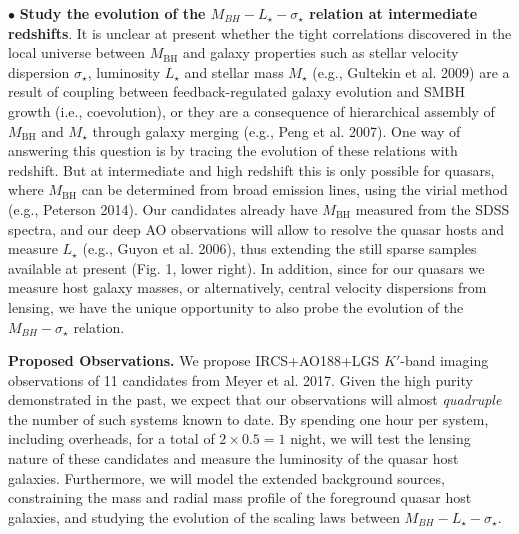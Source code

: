 \documentclass[a4paper,11pt]{article}
\begin{document}
$\bullet$ {\bf Study the evolution of the $M_{BH} - L_\star - \sigma_\star$ relation at intermediate redshifts}. It is unclear at present whether the tight correlations discovered in the local universe between $M_\mathrm{BH}$ and galaxy properties such as stellar velocity dispersion $\sigma_\star$, luminosity $L_\mathrm{\star}$ and stellar mass $M_\mathrm{\star}$ (e.g., Gultekin et al. 2009) are a result of coupling between feedback-regulated galaxy evolution and SMBH growth (i.e., coevolution), or they are a consequence of hierarchical assembly of $M_\mathrm{BH}$ and $M_\mathrm{\star}$ through galaxy merging (e.g., Peng et al. 2007). One way of answering this question is by tracing the evolution of these relations with redshift. But at intermediate and high redshift this is only possible for quasars, where $M_\mathrm{BH}$ can be determined from broad emission lines, using the virial method (e.g., Peterson 2014). Our candidates already have $M_\mathrm{BH}$ measured from the SDSS spectra, and our deep AO observations will allow to resolve the quasar hosts and measure $L_{\star}$ (e.g., Guyon et al. 2006), thus extending the still sparse samples available at present (Fig. 1, lower right). In addition, since for our quasars we measure host galaxy masses, or alternatively, central velocity dispersions from lensing, we have the unique opportunity to also probe the evolution of the $M_{BH} - \sigma_\star$ relation. 

{\bf Proposed Observations.} We propose IRCS+AO188+LGS $K'$-band imaging observations of 11 candidates from Meyer et al. 2017. Given the high purity demonstrated in the past, we expect that our observations will almost {\it quadruple} the number of such systems known to date. By spending one hour per system, including overheads, for a total of $2 \times 0.5 = 1$ night, we will test the lensing nature of these candidates and measure the luminosity of the quasar host galaxies. Furthermore, we will model the extended background sources, constraining the mass and radial mass profile of the foreground quasar host galaxies, and studying the evolution of the scaling laws between $M_{BH} - L_\star - \sigma_\star$.
\end{document}
